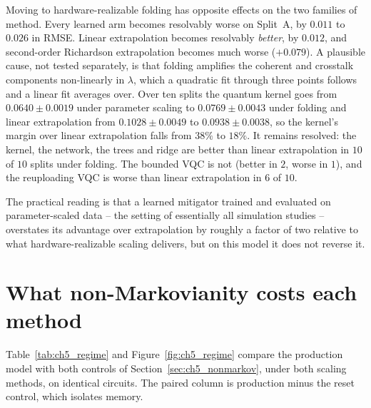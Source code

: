 \documentclass[Thesis.tex]{subfiles}
\begin{document}
Moving to hardware-realizable folding has opposite effects on the two families of
method. Every learned arm becomes resolvably worse on Split~A, by $0.011$ to $0.026$
in RMSE. Linear extrapolation becomes resolvably \emph{better}, by $0.012$, and
second-order Richardson extrapolation becomes much worse ($+0.079$). A plausible
cause, not tested separately, is that folding amplifies the coherent and crosstalk
components non-linearly in $\lambda$, which a quadratic fit through three points
follows and a linear fit averages over. Over ten splits the quantum kernel goes from
$0.0640 \pm 0.0019$ under parameter scaling to $0.0769 \pm 0.0043$ under folding and
linear extrapolation from $0.1028 \pm 0.0049$ to $0.0938 \pm 0.0038$, so the
kernel's margin over linear extrapolation falls from $38\%$ to $18\%$. It remains
resolved: the kernel, the network, the trees and ridge are better than linear
extrapolation in $10$ of $10$ splits under folding. The bounded VQC is not (better
in $2$, worse in $1$), and the reuploading VQC is worse than linear extrapolation in
$6$ of $10$.

The practical reading is that a learned mitigator trained and evaluated on
parameter-scaled data -- the setting of essentially all simulation studies --
overstates its advantage over extrapolation by roughly a factor of two relative to
what hardware-realizable scaling delivers, but on this model it does not reverse
it.

\section{What non-Markovianity costs each method}\label{sec:ch5_markovianity}

Table~\ref{tab:ch5_regime} and Figure~\ref{fig:ch5_regime} compare the production
model with both controls of Section~\ref{sec:ch5_nonmarkov}, under both scaling
methods, on identical circuits. The paired column is production minus the reset
control, which isolates memory.
\end{document}
